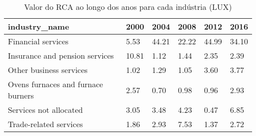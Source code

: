 \begin{table}
\centering
\caption{Valor do RCA ao longo dos anos para cada indústria (LUX)}
\begin{tabular}{p{6cm}p{1.5cm}p{1.5cm}p{1.5cm}p{1.5cm}p{1.5cm}}
\toprule
                     industry\_name &  2000 &  2004 &  2008 &  2012 &  2016 \\
\midrule
                Financial services &  5.53 & 44.21 & 22.22 & 44.99 & 34.10 \\
    Insurance and pension services & 10.81 &  1.12 &  1.44 &  2.35 &  2.39 \\
           Other business services &  1.02 &  1.29 &  1.05 &  3.60 &  3.77 \\
Ovens furnaces and furnace burners &  2.57 &  0.70 &  0.98 &  0.96 &  2.93 \\
            Services not allocated &  3.05 &  3.48 &  4.23 &  0.47 &  6.85 \\
            Trade-related services &  1.86 &  2.93 &  7.53 &  1.37 &  2.72 \\
\bottomrule
\end{tabular}
\end{table}
